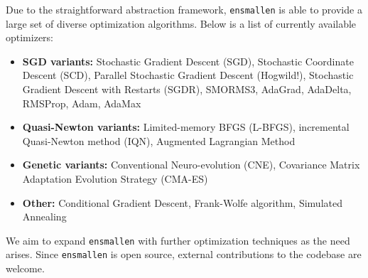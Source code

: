 \documentclass{article}
\begin{document}
Due to the straightforward abstraction framework, {\tt ensmallen} is able to
provide a large set of diverse optimization algorithms.  Below is a list of
currently available optimizers:

\vspace*{-0.4em}
\begin{itemize}
  \item {\bf SGD variants:} Stochastic Gradient Descent (SGD), Stochastic
      Coordinate Descent (SCD), Parallel Stochastic Gradient Descent (Hogwild!),
      Stochastic Gradient Descent with Restarts (SGDR), SMORMS3, AdaGrad,
      AdaDelta, RMSProp, Adam, AdaMax

  \item {\bf Quasi-Newton variants:} Limited-memory BFGS (L-BFGS), incremental
        Quasi-Newton method (IQN), Augmented Lagrangian Method

  \item {\bf Genetic variants:} Conventional Neuro-evolution (CNE), Covariance
        Matrix Adaptation Evolution Strategy (CMA-ES)

  \item {\bf Other:} Conditional Gradient Descent, Frank-Wolfe algorithm, Simulated Annealing

\end{itemize}
\vspace*{-0.4em}


We aim to expand {\tt ensmallen} with further optimization techniques
as the need arises.  Since {\tt ensmallen} is open source,
external contributions to the codebase are welcome.
\end{document}
